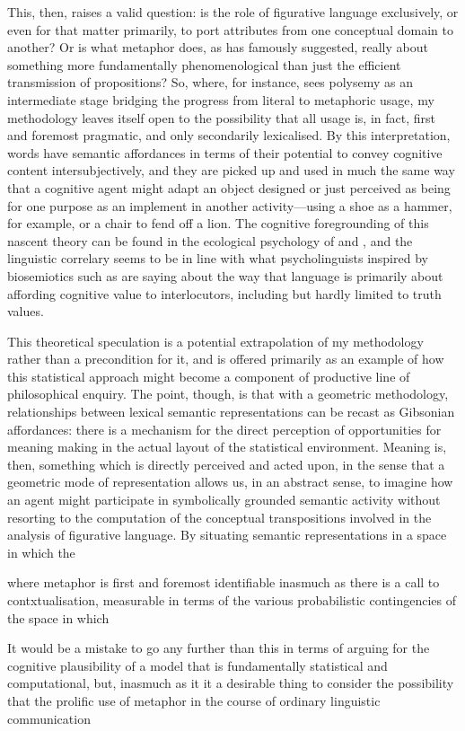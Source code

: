 This, then, raises a valid question: is the role of figurative language exclusively, or even for that matter primarily, to port attributes from one conceptual domain to another?  Or is what metaphor does, as \cite{Davidson1978} has famously suggested, really about something more fundamentally phenomenological than just the efficient transmission of propositions?  So, where, for instance, \cite{Sweetser1990} sees polysemy as an intermediate stage bridging the progress from literal to metaphoric usage, my methodology leaves itself open to the possibility that all usage is, in fact, first and foremost pragmatic, and only secondarily lexicalised.  By this interpretation, words have semantic affordances in terms of their potential to convey cognitive content intersubjectively, and they are picked up and used in much the same way that a cognitive agent might adapt an object designed or just perceived as being for one purpose as an implement in another activity---using a shoe as a hammer, for example, or a chair to fend off a lion.  The cognitive foregrounding of this nascent theory can be found in the ecological psychology of \cite{Gibson1979} and \cite{Bateson1972}, and the linguistic correlary seems to be in line with what psycholinguists inspired by biosemiotics such as \cite{RaczasekLeonardiEA2015} are saying about the way that language is primarily about affording cognitive value to interlocutors, including but hardly limited to truth values.

This theoretical speculation is a potential extrapolation of my methodology rather than a precondition for it, and is offered primarily as an example of how this statistical approach might become a component of productive line of philosophical enquiry.  The point, though, is that with a geometric methodology, relationships between lexical semantic representations can be recast as Gibsonian affordances: there is a mechanism for the direct perception of opportunities for meaning making in the actual layout of the statistical environment.  Meaning is, then, something which is directly perceived and acted upon, in the sense that a geometric mode of representation allows us, in an abstract sense, to imagine how an agent might participate in symbolically grounded semantic activity without resorting to the computation of the conceptual transpositions involved in the analysis of figurative language.  By situating semantic representations in a space in which the 

where metaphor is first and foremost identifiable inasmuch as there is a call to contxtualisation, measurable in terms of the various probabilistic contingencies of the space in which 

  It would be a mistake to go any further than this in terms of arguing for the cognitive plausibility of a model that is fundamentally statistical and computational, but, inasmuch as it it a desirable thing to consider the possibility that the prolific use of metaphor in the course of ordinary linguistic communication 
